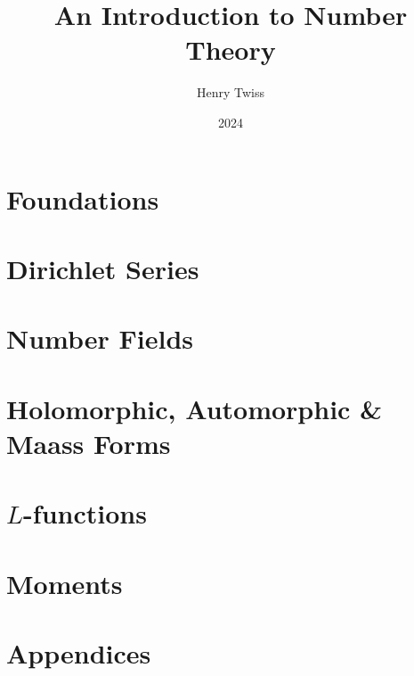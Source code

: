 \documentclass[12pt,oneside]{book}
\title{An Introduction to Number Theory}
\author{Henry Twiss}
\date{2024}
\begin{document}
\maketitle
\pagestyle{empty}
\tableofcontents
\setcounter{page}{0}
\pagestyle{fancy}

\part{Foundations}
  

\part{Dirichlet Series}
  
  

\part{Number Fields}
  
  
  

\part{Holomorphic, Automorphic \& Maass Forms}
  
  
  
  

\part{\texorpdfstring{$L$}{L}-functions}
  
  
  

\part{Moments}
  
  

\part{Appendices}
  

\printindex


\end{document}
